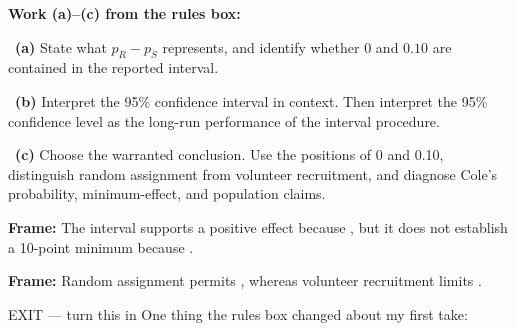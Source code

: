 \documentclass[11pt]{article}
\begin{document}
\newpage
\textbf{Work (a)--(c) from the rules box:}\par\smallskip

~\textbf{(a)} State what $p_R-p_S$ represents, and identify whether $0$ and $0.10$ are contained in the reported interval.\par
\workspace{0.7in}

~\textbf{(b)} Interpret the 95\% confidence interval in context. Then interpret the 95\% confidence level as the long-run performance of the interval procedure.\par
\workspace{1.4in}

~\textbf{(c)} Choose the warranted conclusion. Use the positions of 0 and 0.10, distinguish random assignment from volunteer recruitment, and diagnose Cole's probability, minimum-effect, and population claims.\par
\workspace{2.0in}

\begin{sentenceframebox}\raggedright\textbf{Frame:} The interval supports a positive effect because \blank[1.8in], but it does not establish a 10-point minimum because \blank[2.0in].\end{sentenceframebox}

\begin{sentenceframebox}\raggedright\textbf{Frame:} Random assignment permits \blank[1.5in], whereas volunteer recruitment limits \blank[2.3in].\end{sentenceframebox}

\begin{summaryexitbox}{EXIT --- turn this in}
One thing the rules box changed about my first take: \hrulefill\par
\workspace{0.4in}
\end{summaryexitbox}
\end{document}
